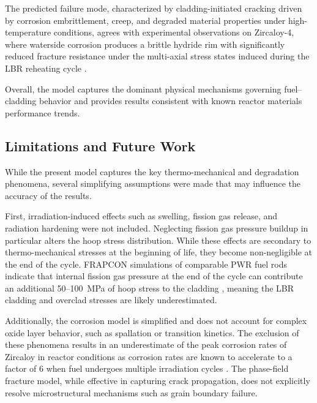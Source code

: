 The predicted failure mode, characterized by cladding-initiated cracking driven by corrosion embrittlement, creep, and degraded material properties under high-temperature conditions, agrees with experimental observations on Zircaloy-4, where waterside corrosion produces a brittle hydride rim with significantly reduced fracture resistance under the multi-axial stress states induced during the LBR reheating cycle \cite{ONReader}. %

Overall, the model captures the dominant physical mechanisms governing fuel--cladding behavior and provides results consistent with known reactor materials performance trends.

\subsection{Limitations and Future Work}

While the present model captures the key thermo-mechanical and degradation phenomena, several simplifying assumptions were made that may influence the accuracy of the results.

First, irradiation-induced effects such as swelling, fission gas release, and radiation hardening were not included. Neglecting fission gas pressure buildup in particular alters the hoop stress distribution. While these effects are secondary to thermo-mechanical stresses at the beginning of life, they become non-negligible at the end of the cycle. FRAPCON simulations of comparable PWR fuel rods indicate that internal fission gas pressure at the end of the cycle can contribute an additional 50--100~MPa of hoop stress to the cladding \cite{2015FRAPCON-4.0Assessment.}, %
 meaning the LBR cladding and overclad stresses are likely underestimated.

Additionally, the corrosion model is simplified and does not account for complex oxide layer behavior, such as spallation or transition kinetics. The exclusion of these phenomena results in an underestimate of the peak corrosion rates of Zircaloy in reactor conditions as corrosion rates are known to accelerate to a factor of 6 when fuel undergoes multiple irradiation cycles %
\cite{Bouineau01062010}. The phase-field fracture model, while effective in capturing crack propagation, does not explicitly resolve microstructural mechanisms such as grain boundary failure.

